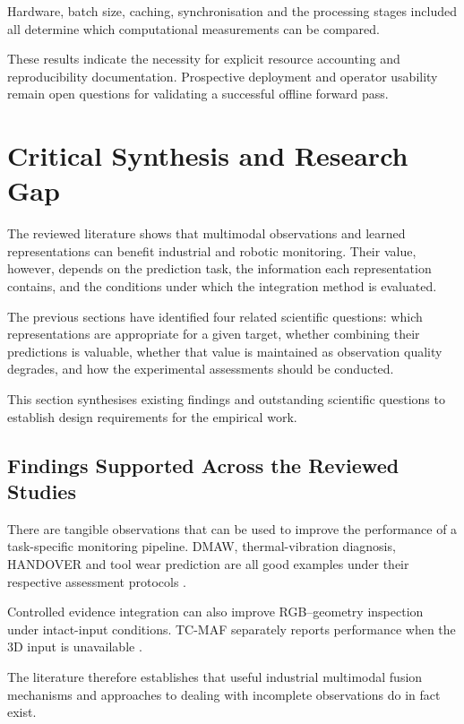 Hardware, batch size, caching, synchronisation and the processing stages included all determine
which computational measurements can be compared.

These results indicate the necessity for explicit resource accounting and reproducibility
documentation. Prospective deployment and operator usability remain open questions for validating a
successful offline forward pass.

\section{Critical Synthesis and Research Gap}

The reviewed literature shows that multimodal observations and learned representations can benefit
industrial and robotic monitoring. Their value, however, depends on the prediction task, the
information each representation contains, and the conditions under which the integration method is
evaluated.

The previous sections have identified four related scientific questions: which representations are
appropriate for a given target, whether combining their predictions is valuable, whether that value
is maintained as observation quality degrades, and how the experimental assessments should be
conducted.

This section synthesises existing findings and outstanding scientific questions to establish design
requirements for the empirical work.

\subsection{Findings Supported Across the Reviewed Studies}

There are tangible observations that can be used to improve the performance of a task-specific
monitoring pipeline. DMAW, thermal-vibration diagnosis, HANDOVER and tool wear prediction are all
good examples under their respective assessment protocols
\citep{P003,Huo2022Multisensor,Thoduka2024Handover,P045}.

Controlled evidence integration can also improve RGB--geometry inspection under intact-input
conditions. TC-MAF separately reports performance when the 3D input is unavailable \citep{P026}.

The literature therefore establishes that useful industrial multimodal fusion mechanisms and
approaches to dealing with incomplete observations do in fact exist.

